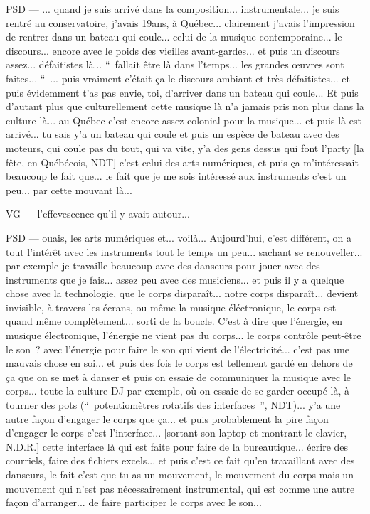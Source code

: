 PSD — ... quand je suis arrivé dans la composition... instrumentale... je suis rentré au conservatoire, j'avais 19ans, à Québec... clairement j'avais l'impression de rentrer dans un bateau qui coule... celui de la musique contemporaine... le discours... encore avec le poids des vieilles avant-gardes... et puis un discours assez... défaitistes là... “ fallait être là dans l'temps... les grandes œuvres sont faites... “ ... puis vraiment c'était ça le discours ambiant et très défaitistes... et puis évidemment t'as pas envie, toi, d'arriver dans un bateau qui coule... Et puis d'autant plus que culturellement cette musique là n'a jamais pris non plus dans la culture là... au Québec c'est encore assez colonial pour la musique... et puis là est arrivé... tu sais y'a un bateau qui coule et puis un espèce de bateau avec des moteurs, qui coule pas du tout, qui va vite, y'a des gens dessus qui font l'party [la fête, en Québécois, NDT] c'est celui des arts numériques, et puis ça m'intéressait beaucoup le fait que... le fait que je me sois intéressé aux instruments c'est un peu... par cette mouvant là...

VG — l'effevescence qu'il y avait autour...

PSD — ouais, les arts numériques et... voilà... Aujourd'hui, c'est différent, on a tout l'intérêt avec les instruments tout le temps un peu... sachant se renouveller... par exemple je travaille beaucoup avec des danseurs pour jouer avec des instruments que je fais... assez peu avec des musiciens... et puis il y a quelque chose avec la technologie, que le corps disparaît... notre corps disparaît... devient invisible, à travers les écrans, ou même la musique éléctronique, le corps est quand même complètement... sorti de la boucle. C'est à dire que l'énergie, en musique électronique, l'énergie ne vient pas du corps... le corps contrôle peut-être le son ? avec l'énergie pour faire le son qui vient de l'électricité... c'est pas une mauvais chose en soi... et puis des fois le corps est tellement gardé en dehors de ça que on se met à danser et puis on essaie de communiquer la musique avec le corps... toute la culture DJ par exemple, où on essaie de se garder occupé là, à tourner des pots (“ potentiomètres rotatifs des interfaces ”, NDT)... y'a une autre façon d'engager le corps que ça... et puis probablement la pire façon d'engager le corps c'est l'interface... [sortant son laptop et montrant le clavier, N.D.R.] cette interface là qui est faite pour faire de la bureautique... écrire des courriels, faire des  fichiers excels... et puis c'est ce fait qu'en travaillant avec des danseurs, le fait c'est que tu as un mouvement, le mouvement du corps mais un mouvement qui n'est pas nécessairement instrumental, qui est comme une autre façon d'arranger... de faire participer le corps avec le son...


